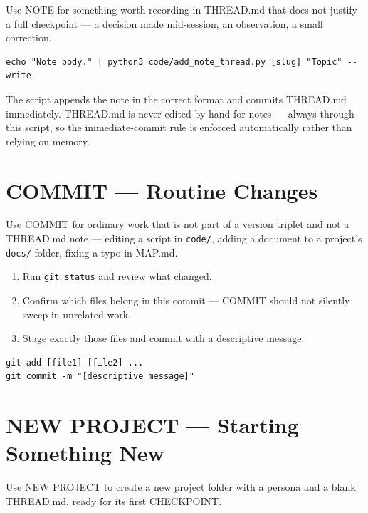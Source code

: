 \documentclass[12pt,letterpaper]{article}
\begin{document}
Use NOTE for something worth recording in THREAD.md that does not justify
a full checkpoint --- a decision made mid-session, an observation, a
small correction.

\begin{lstlisting}
echo "Note body." | python3 code/add_note_thread.py [slug] "Topic" --write
\end{lstlisting}

The script appends the note in the correct format and commits THREAD.md
immediately. THREAD.md is never edited by hand for notes --- always
through this script, so the immediate-commit rule is enforced
automatically rather than relying on memory.

\section{COMMIT --- Routine Changes}

Use COMMIT for ordinary work that is not part of a version triplet and
not a THREAD.md note --- editing a script in \texttt{code/}, adding a
document to a project's \texttt{docs/} folder, fixing a typo in MAP.md.

\begin{mdframed}[style=stepbox]
\begin{enumerate}
\item Run \texttt{git status} and review what changed.
\item Confirm which files belong in this commit --- COMMIT should not
      silently sweep in unrelated work.
\item Stage exactly those files and commit with a descriptive message.
\end{enumerate}
\end{mdframed}

\begin{lstlisting}
git add [file1] [file2] ...
git commit -m "[descriptive message]"
\end{lstlisting}

\section{NEW PROJECT --- Starting Something New}

Use NEW PROJECT to create a new project folder with a persona and a blank
THREAD.md, ready for its first CHECKPOINT.
\end{document}

